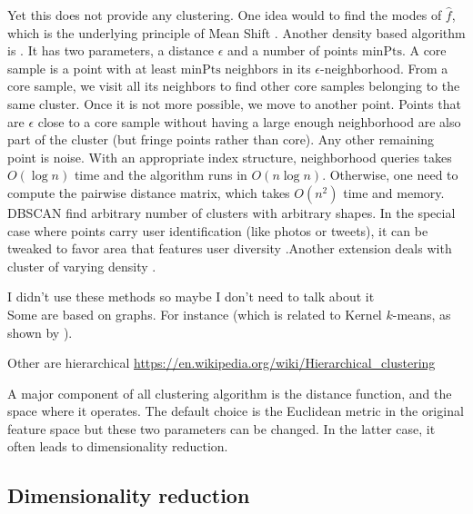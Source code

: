 Yet this does not provide any clustering. One idea would to find the modes of
$\hat{f}$, which is the underlying principle of Mean Shift
\autocite{MeanShift95}. Another density based algorithm is 
\autocite{DBSCAN96}. It has two parameters, a distance $\epsilon$ and a number
of points $\mathrm{minPts}$. A core sample is a point with at least
$\mathrm{minPts}$ neighbors in its $\epsilon$-neighborhood. From a core
sample, we visit all its neighbors to find other core samples belonging to the
same cluster. Once it is not more possible, we move to another point. Points
that are $\epsilon$ close to a core sample without having a large enough
neighborhood are also part of the cluster (but fringe points rather than
core). Any other remaining point is noise. With an appropriate index
structure, neighborhood queries takes $O(\log n)$ time and the algorithm runs
in $O(n\log n)$. Otherwise, one need to compute the pairwise distance matrix,
which takes $O(n^2)$ time and memory. DBSCAN find arbitrary number of clusters
with arbitrary shapes. In the special case where points carry user
identification (like photos or tweets), it can be tweaked to favor area that
features user diversity \autocite{PDBSCANKisilevich2010}.Another extension deals with cluster of varying density
\autocite{OPTICS99}.

\begin{comments}
	I didn't use these methods so maybe I don't need to talk about it\\
	Some are based on graphs. For instance  \autocite{SpectralClustering01} (which is related to
	Kernel $k$-means, as shown by \textcite{KernelKmeans04}).
	 \autocite{AffinityPropagation07}

	Other are hierarchical
\url{https://en.wikipedia.org/wiki/Hierarchical_clustering}
\end{comments}

A major component of all clustering algorithm is the distance function, and
the space where it operates. The default choice is the Euclidean metric in the
original feature space but these two parameters can be changed. In the latter
case, it often leads to dimensionality reduction.

\subsection{Dimensionality reduction}

